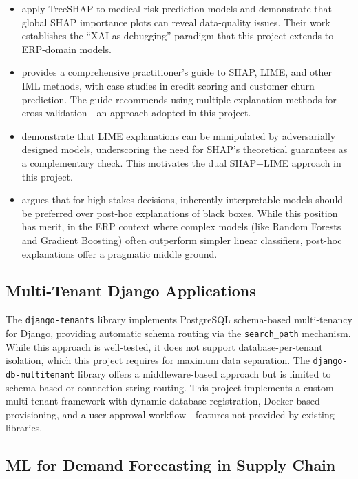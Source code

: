 \documentclass[12pt,a4paper]{report}
\begin{document}
\begin{itemize}
  \item \citet{lundberg2020local} apply TreeSHAP to medical risk prediction models and demonstrate that global SHAP importance plots can reveal data-quality issues. Their work establishes the ``XAI as debugging'' paradigm that this project extends to ERP-domain models.

  \item \citet{molnar2022interpretable} provides a comprehensive practitioner's guide to SHAP, LIME, and other IML methods, with case studies in credit scoring and customer churn prediction. The guide recommends using multiple explanation methods for cross-validation---an approach adopted in this project.

  \item \citet{slack2020fooling} demonstrate that LIME explanations can be manipulated by adversarially designed models, underscoring the need for SHAP's theoretical guarantees as a complementary check. This motivates the dual SHAP+LIME approach in this project.

  \item \citet{rudin2019stop} argues that for high-stakes decisions, inherently interpretable models should be preferred over post-hoc explanations of black boxes. While this position has merit, in the ERP context where complex models (like Random Forests and Gradient Boosting) often outperform simpler linear classifiers, post-hoc explanations offer a pragmatic middle ground.
\end{itemize}

\subsection{Multi-Tenant Django Applications}

The \texttt{django-tenants} library implements PostgreSQL schema-based multi-tenancy for Django, providing automatic schema routing via the \texttt{search\_path} mechanism. While this approach is well-tested, it does not support database-per-tenant isolation, which this project requires for maximum data separation. The \texttt{django-db-multitenant} library offers a middleware-based approach but is limited to schema-based or connection-string routing. This project implements a custom multi-tenant framework with dynamic database registration, Docker-based provisioning, and a user approval workflow---features not provided by existing libraries.

\subsection{ML for Demand Forecasting in Supply Chain}
\end{document}
